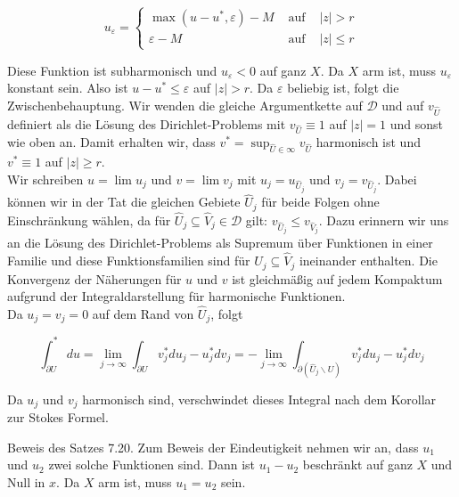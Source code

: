 \documentclass[10pt, letterpaper]{article}
\begin{document}
$$
u_{\varepsilon}=\left\{\begin{array}{lll}
\max \left(u-u^{*}, \varepsilon\right)-M & \text { auf } & |z|>r \\
\varepsilon-M & \text { auf } & |z| \leqslant r
\end{array}\right.
$$

Diese Funktion ist subharmonisch und $u_{\varepsilon}<0$ auf ganz $X$. Da $X$ arm ist, muss $u_{\varepsilon}$ konstant sein. Also ist $u-u^{*} \leqslant \varepsilon$ auf $|z|>r$. Da $\varepsilon$ beliebig ist, folgt die Zwischenbehauptung. Wir wenden die gleiche Argumentkette auf $\mathcal{D}$ und auf $v_{\hat{U}}$ definiert als die Lösung des Dirichlet-Problems mit $v_{\hat{U}} \equiv 1$ auf $|z|=1$ und sonst wie oben an. Damit erhalten wir, dass $v^{*}=\sup _{\hat{U} \in \infty} v_{\hat{U}}$ harmonisch ist und $v^{*} \equiv 1$ auf $|z| \geqslant r$.\\
Wir schreiben $u=\lim u_{j}$ und $v=\lim v_{j}$ mit $u_{j}=u_{\hat{U}_{j}}$ und $v_{j}=v_{\hat{U}_{j}}$. Dabei können wir in der Tat die gleichen Gebiete $\hat{U}_{j}$ für beide Folgen ohne Einschränkung wählen, da für $\hat{U}_{j} \subseteq \hat{V}_{j} \in \mathcal{D}$ gilt: $v_{\hat{U}_{j}} \leqslant v_{\hat{V}_{j}}$. Dazu erinnern wir uns an die Lösung des Dirichlet-Problems als Supremum über Funktionen in einer Familie und diese Funktionsfamilien sind für $\hat{U}_{j} \subseteq \hat{V}_{j}$ ineinander enthalten. Die Konvergenz der Näherungen für $u$ und $v$ ist gleichmäßig auf jedem Kompaktum aufgrund der Integraldarstellung für harmonische Funktionen.\\
Da $u_{j}=v_{j}=0$ auf dem Rand von $\hat{U}_{j}$, folgt

$$
\int_{\partial U}^{*} d u=\lim _{j \rightarrow \infty} \int_{\partial U} v_{j}^{*} d u_{j}-u_{j}^{*} d v_{j}=-\lim _{j \rightarrow \infty} \int_{\partial\left(\hat{U}_{j} \backslash U\right)} v_{j}^{*} d u_{j}-u_{j}^{*} d v_{j}
$$

Da $u_{j}$ und $v_{j}$ harmonisch sind, verschwindet dieses Integral nach dem Korollar zur Stokes Formel.

Beweis des Satzes 7.20. Zum Beweis der Eindeutigkeit nehmen wir an, dass $u_{1}$ und $u_{2}$ zwei solche Funktionen sind. Dann ist $u_{1}-u_{2}$ beschränkt auf ganz $X$ und Null in $x$. Da $X$ arm ist, muss $u_{1}=u_{2}$ sein.
\end{document}
